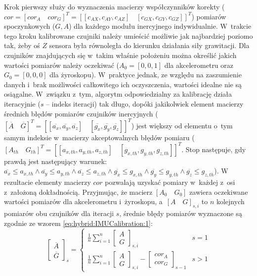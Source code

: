 Krok pierwszy służy do wyznaczenia macierzy współczynników korekty ($cor = [cor_A \quad cor_G]^T = [[c_{AX},c_{AY},c_{AZ}]\quad [c_{GX},c_{GY},c_{GZ}]]^T $) pomiarów spoczynkowych ($G, A$) dla każdego modułu inercyjnego indywidualnie. W~trakcie tego kroku kalibrowane czujniki należy umieścić możliwie jak najbardziej poziomo tak, żeby oś $Z$ sensora była równoległa do kierunku działania siły grawitacji. Dla czujników znajdujących się w~takim właśnie położeniu można określić jakich wartości pomiarów należy oczekiwać ($A_0 = [0,0,1]$ dla akcelerometru oraz $G_0 = [0,0,0]$ dla żyroskopu). W~praktyce jednak, ze względu na zaszumienie danych i~brak możliwości całkowitego ich oczyszczenia, wartości idealne nie są osiągalne. W~związku z~tym, algorytm odpowiedzialny za kalibrację działa iteracyjnie ($s$ -- indeks iteracji) tak długo, dopóki jakikolwiek element macierzy średnich błędów pomiarów czujników inercyjnych ($[\overline{A}\quad \overline{G}]^T = [[\overline{a_x},\overline{a_y},\overline{a_z}]\quad[\overline{g_x},\overline{g_y},\overline{g_z}]]^T$) jest większy od elementu o~tym samym indeksie w~macierzy akceptowalnych błędów pomiaru ($[A_{th}\quad G_{th}]^T = [[a_{x,th},a_{y,th},a_{z,th}]\quad[g_{x,th},g_{y,th},g_{z,th}]]^T $. Stop następuje, gdy prawdą jest następujący warunek: $\overline{a_x}\leq a_{x,th} \land \overline{a_y} \leq a_{y,th} \land \overline{a_z} \leq a_{z,th} \land \overline{g_x} \leq g_{x,th} \land \overline{g_y} \leq g_{y,th} \land \overline{g_z} \leq g_{z,th}$). W rezultacie elementy macierzy $cor$ pozwalają uzyskać pomiary w~każdej z~osi z~założoną dokładnością. Przyjmując, że macierz $[A_0\quad G_0]$ zawiera oczekiwane wartości pomiarów dla akcelerometru i~żyroskopu, a~$[A\quad G]_{s,i}$ to $n$ kolejnych pomiarów obu czujników dla iteracji $s$, średnie błędy pomiarów wyznaczone są zgodnie ze wzorem \ref{eq:hybrid:IMUCalibration:1}:
\begin{equation}
	\begin{bmatrix} \overline{A} \\ \overline{G} \end{bmatrix}_s =
	\begin{cases}
		\frac{1}{n}\sum_{i=1}^{n}{\begin{bmatrix}A \\ G\end{bmatrix}_{s,i}} & s = 1\\
		\frac{1}{n}\sum_{i=1}^{n}{\begin{bmatrix}A \\ G\end{bmatrix}_{s,i} - \begin{bmatrix}cor_A\\ cor_G\end{bmatrix}_{s-1}} &  s > 1
	\end{cases}
	\label{eq:hybrid:IMUCalibration:1}
\end{equation}

